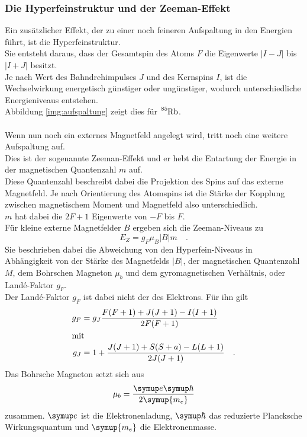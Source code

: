 \subsubsection{Die Hyperfeinstruktur und der Zeeman-Effekt}

\noindent
Ein zusätzlicher Effekt, der zu einer noch feineren Aufspaltung in den Energien führt, ist die Hyperfeinstruktur.\\
Sie entsteht daraus, dass der Gesamtspin des Atoms $F$ die Eigenwerte $\bigl| I - J \bigr|$ bis $\bigl| I + J \bigr|$ besitzt.\\
Je nach Wert des Bahndrehimpulses $J$ und des Kernspins $I$, ist die Wechselwirkung energetisch günstiger oder ungünstiger, wodurch unterschiedliche Energieniveaus entstehen.\\
Abbildung \ref{img:aufspaltung} zeigt dies für $\ce{^{85}Rb}$.\\\\

\noindent
Wenn nun noch ein externes Magnetfeld angelegt wird, tritt noch eine weitere Aufspaltung auf.\\
Dies ist der sogenannte Zeeman-Effekt und er hebt die Entartung der Energie in der magnetischen Quantenzahl $m$ auf.\\
Diese Quantenzahl beschreibt dabei die Projektion des Spins auf das externe Magnetfeld. 
Je nach Orientierung des Atomspins ist die Stärke der Kopplung zwischen magnetischem Moment und Magnetfeld also unterschiedlich.\\
$m$ hat dabei die $2F+1$ Eigenwerte von $-F$ bis $F$.\\
Für kleine externe Magnetfelder $B$  ergeben sich die Zeeman-Niveaus zu 
\begin{equation}
    E_Z = g_F \mu_B \bigl| B \bigr| m \quad .
    \label{eqn:zeeman}
\end{equation}
Sie beschrieben dabei die Abweichung von den Hyperfein-Niveaus in Abhängigkeit von der Stärke des Magnetfelds $\bigl| B \bigr|$, 
der magnetischen Quantenzahl $M$, dem Bohrschen Magneton $\mu_b$ und dem gyromagnetischen Verhältnis, oder Landé-Faktor $g_F$.\\
Der Landé-Faktor $g_F$ ist dabei nicht der des Elektrons. Für ihn gilt
\begin{align*}
    g_F &= g_J\frac{F(F+1) + J(J+1) - I(I+1)}{2F(F+1)}\\
    \intertext{mit}
    g_J &= 1 + \frac{J(J+1) + S(S+a) -L(L+1)}{2J(J+1)} \quad .
\end{align*}
Das Bohrsche Magneton setzt sich aus 
\begin{equation*}
    \mu_b = \frac{\symup e \symup \hbar}{2\symup{m_e}}
\end{equation*}
zusammen. $\symup e$  ist die Elektronenladung\cite{e0}, $\symup \hbar$ das reduzierte Plancksche Wirkungsquantum\cite{Planck} und $\symup{m_e}$ die Elektronenmasse\cite{m_e}.

